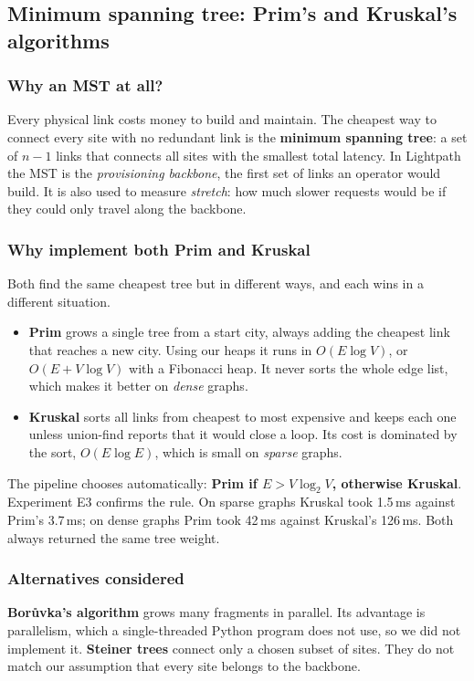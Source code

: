 \subsection{Minimum spanning tree: Prim's and Kruskal's algorithms}
\subsubsection{Why an MST at all?}
Every physical link costs money to build and maintain. The cheapest way to connect every site with no redundant link is the \textbf{minimum spanning tree}: a set of $n-1$ links that connects all sites with the smallest total latency. In Lightpath the MST is the \emph{provisioning backbone}, the first set of links an operator would build. It is also used to measure \emph{stretch}: how much slower requests would be if they could only travel along the backbone.

\subsubsection{Why implement both Prim and Kruskal}
Both find the same cheapest tree but in different ways, and each wins in a different situation.
\begin{itemize}[leftmargin=*]
  \item \textbf{Prim} \cite{prim1957} grows a single tree from a start city, always adding the cheapest link that reaches a new city. Using our heaps it runs in $O(E\log V)$, or $O(E+V\log V)$ with a Fibonacci heap. It never sorts the whole edge list, which makes it better on \emph{dense} graphs.
  \item \textbf{Kruskal} \cite{kruskal1956} sorts all links from cheapest to most expensive and keeps each one unless union-find reports that it would close a loop. Its cost is dominated by the sort, $O(E\log E)$, which is small on \emph{sparse} graphs.
\end{itemize}
The pipeline chooses automatically: \textbf{Prim if $E > V\log_2 V$, otherwise Kruskal}. Experiment E3 confirms the rule. On sparse graphs Kruskal took 1.5\,ms against Prim's 3.7\,ms; on dense graphs Prim took 42\,ms against Kruskal's 126\,ms. Both always returned the same tree weight.

\subsubsection{Alternatives considered}
\textbf{Bor\r{u}vka's algorithm} grows many fragments in parallel. Its advantage is parallelism, which a single-threaded Python program does not use, so we did not implement it. \textbf{Steiner trees} connect only a chosen subset of sites. They do not match our assumption that every site belongs to the backbone.

